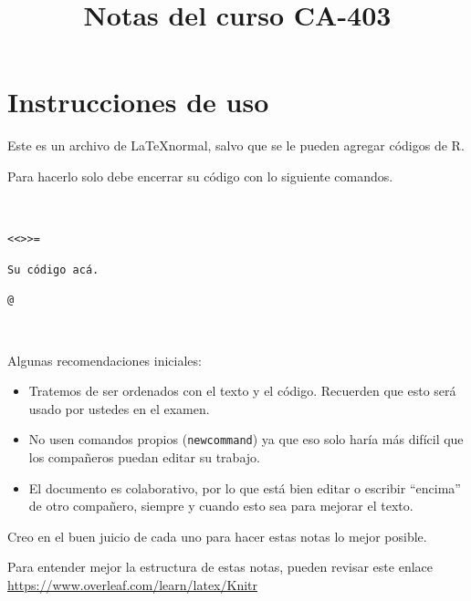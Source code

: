 \documentclass[12pt]{book}\usepackage[]{graphicx}\usepackage[]{color}
\theoremstyle{definition}
\theoremstyle{plain}
\begin{document}





\title{Notas del curso CA-403}
\author{}
\date{}
\maketitle




\section*{Instrucciones de uso}

Este es un archivo de \LaTeX normal, salvo que se le pueden agregar códigos de R.

Para hacerlo solo debe encerrar su código con lo siguiente comandos.

\

\noindent\verb|<<>>=|

\verb|Su código acá.|

\noindent\verb|@|

\

Algunas recomendaciones iniciales:

\begin{itemize}
	\item Tratemos de ser ordenados con el texto y el código. Recuerden que esto será usado por ustedes en el examen.
	\item No usen comandos propios (\texttt{newcommand}) ya que eso solo haría más difícil que los compañeros puedan editar su trabajo.
	\item El documento es colaborativo, por lo que está bien editar o escribir ``encima'' de otro compañero, siempre y cuando esto sea para mejorar el texto.
\end{itemize}

Creo en el buen juicio de cada uno para hacer estas notas lo mejor posible.

\begin{minipage}[c]{0.5\textwidth}
	Para entender mejor la estructura de estas notas, pueden revisar este enlace \url{https://www.overleaf.com/learn/latex/Knitr}
\end{minipage}

\newpage




\end{document}

